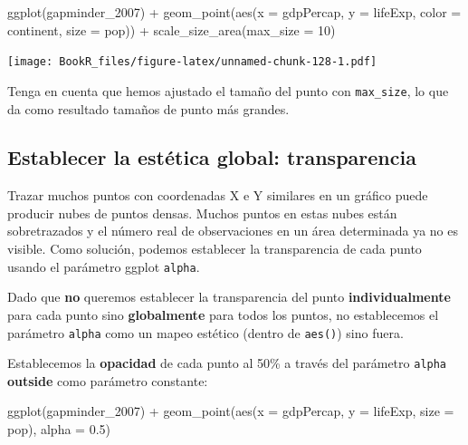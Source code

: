 \documentclass[
]{book}
\newenvironment{Shaded}{\begin{snugshade}}{\end{snugshade}}
\newcommand{\AttributeTok}[1]{\textcolor[rgb]{0.77,0.63,0.00}{#1}}
\newcommand{\DecValTok}[1]{\textcolor[rgb]{0.00,0.00,0.81}{#1}}
\newcommand{\FloatTok}[1]{\textcolor[rgb]{0.00,0.00,0.81}{#1}}
\newcommand{\FunctionTok}[1]{\textcolor[rgb]{0.00,0.00,0.00}{#1}}
\newcommand{\NormalTok}[1]{#1}
\newcommand{\SpecialCharTok}[1]{\textcolor[rgb]{0.00,0.00,0.00}{#1}}
\begin{document}
\begin{Shaded}
\begin{Highlighting}[]
\FunctionTok{ggplot}\NormalTok{(gapminder\_2007) }\SpecialCharTok{+} 
  \FunctionTok{geom\_point}\NormalTok{(}\FunctionTok{aes}\NormalTok{(}\AttributeTok{x =}\NormalTok{ gdpPercap, }\AttributeTok{y =}\NormalTok{ lifeExp,}
                 \AttributeTok{color =}\NormalTok{ continent,}
                 \AttributeTok{size =}\NormalTok{ pop)) }\SpecialCharTok{+} 
  \FunctionTok{scale\_size\_area}\NormalTok{(}\AttributeTok{max\_size =} \DecValTok{10}\NormalTok{)}
\end{Highlighting}
\end{Shaded}

\texttt{[image: BookR\_files/figure-latex/unnamed-chunk-128-1.pdf]}

Tenga en cuenta que hemos ajustado el tamaño del punto con \texttt{max\_size}, lo que da como resultado tamaños de punto más grandes.

\hypertarget{establecer-la-estuxe9tica-global-transparencia}{%
\subsection{Establecer la estética global: transparencia}\label{establecer-la-estuxe9tica-global-transparencia}}

Trazar muchos puntos con coordenadas X e Y similares en un gráfico puede producir nubes de puntos densas. Muchos puntos en estas nubes están sobretrazados y el número real de observaciones en un área determinada ya no es visible. Como solución, podemos establecer la transparencia de cada punto usando el parámetro ggplot \texttt{alpha}.

Dado que \textbf{no} queremos establecer la transparencia del punto \textbf{individualmente} para cada punto sino \textbf{globalmente} para todos los puntos, no establecemos el parámetro \texttt{alpha} como un mapeo estético (dentro de \texttt{aes()}) sino fuera.

Establecemos la \textbf{opacidad} de cada punto al 50\% a través del parámetro \texttt{alpha} \textbf{outside} como parámetro constante:

\begin{Shaded}
\begin{Highlighting}[]
\FunctionTok{ggplot}\NormalTok{(gapminder\_2007) }\SpecialCharTok{+} 
  \FunctionTok{geom\_point}\NormalTok{(}\FunctionTok{aes}\NormalTok{(}\AttributeTok{x =}\NormalTok{ gdpPercap, }\AttributeTok{y =}\NormalTok{ lifeExp, }\AttributeTok{size =}\NormalTok{ pop), }
             \AttributeTok{alpha =} \FloatTok{0.5}\NormalTok{)}
\end{Highlighting}
\end{Shaded}
\end{document}
